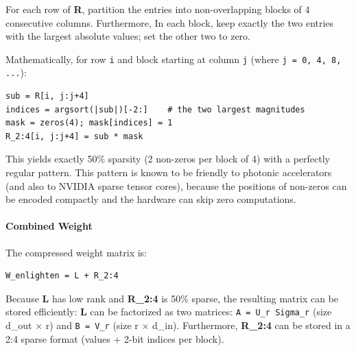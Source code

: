 For each row of \textbf{R}, partition the entries into non-overlapping blocks of 4 consecutive columns. Furthermore, In each block, keep exactly the two entries with the largest absolute values; set the other two to zero.


Mathematically, for row \texttt{i} and block starting at column \texttt{j} (where \texttt{j = 0, 4, 8, ...}):

\vspace{0.5em}
\begin{mdframed}[backgroundcolor=codebg, linecolor=codeframe, linewidth=1pt, roundcorner=4pt, innerleftmargin=2pt, innerrightmargin=5pt, innertopmargin=5pt, innerbottommargin=5pt]
\begin{lstlisting}
sub = R[i, j:j+4]
indices = argsort(|sub|)[-2:]    # the two largest magnitudes
mask = zeros(4); mask[indices] = 1
R_2:4[i, j:j+4] = sub * mask
\end{lstlisting}
\end{mdframed}
\vspace{0.5em}

This yields exactly 50\% sparsity (2 non-zeros per block of 4) with a perfectly regular pattern. This pattern is known to be friendly to photonic accelerators (and also to NVIDIA sparse tensor cores), because the positions of non-zeros can be encoded compactly and the hardware can skip zero computations.

\paragraph{Combined Weight}

The compressed weight matrix is:

\vspace{0.5em}
\begin{mdframed}[backgroundcolor=codebg, linecolor=codeframe, linewidth=1pt, roundcorner=4pt, innerleftmargin=2pt, innerrightmargin=5pt, innertopmargin=5pt, innerbottommargin=5pt]
\begin{lstlisting}
W_enlighten = L + R_2:4
\end{lstlisting}
\end{mdframed}
\vspace{0.5em}

Because \textbf{L} has low rank and \textbf{R\_2:4} is 50\% sparse, the resulting matrix can be stored efficiently:
\textbf{L} can be factorized as two matrices: \texttt{A = U\_r Sigma\_r} (size d\_out $\times$ r) and \texttt{B = V\_r} (size r $\times$ d\_in). Furthermore, \textbf{R\_2:4} can be stored in a 2:4 sparse format (values + 2-bit indices per block).


